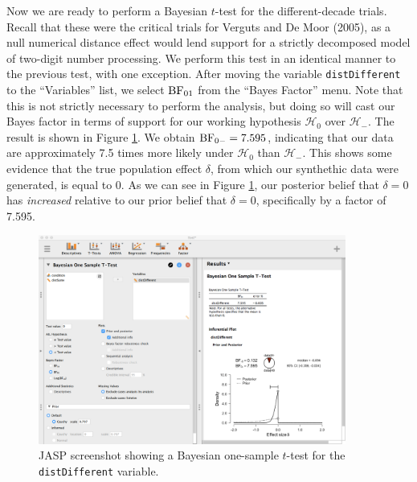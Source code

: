 \documentclass[english,,doc,floatsintext]{apa6}
\begin{document}
Now we are ready to perform a Bayesian \(t\)-test for the different-decade trials. Recall that these were the critical trials for Verguts and De Moor (2005), as a null numerical distance effect would lend support for a strictly decomposed model of two-digit number processing. We perform this test in an identical manner to the previous test, with one exception. After moving the variable \texttt{distDifferent} to the ``Variables'' list, we select \(\textnormal{BF}_{01}\) from the ``Bayes Factor'' menu. Note that this is not strictly necessary to perform the analysis, but doing so will cast our Bayes factor in terms of support for our working hypothesis \(\mathcal{H}_{0}\) over \(\mathcal{H}_{-}\). The result is shown in Figure \ref{fig:ttestBayes2}. We obtain \(\textnormal{BF}_{0-}=7.595\), indicating that our data are approximately 7.5 times more likely under \(\mathcal{H}_{0}\) than \(\mathcal{H}_{-}\). This shows some evidence that the true population effect \(\delta\), from which our synthethic data were generated, is equal to 0. As we can see in Figure \ref{fig:ttestBayes2}, our posterior belief that \(\delta=0\) has \emph{increased} relative to our prior belief that \(\delta=0\), specifically by a factor of 7.595.

\begin{figure}
\centering
\includegraphics[width=0.9\textwidth,height=\textheight]{figures/ttestBayes2.png}
\caption{\label{fig:ttestBayes2}JASP screenshot showing a Bayesian one-sample \(t\)-test for the \texttt{distDifferent} variable.}
\end{figure}
\end{document}
